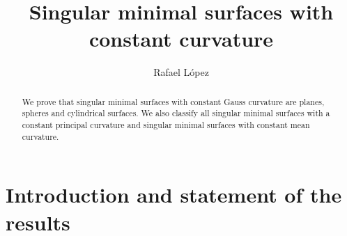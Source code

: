 \documentclass{birkjour}
\theoremstyle{definition}
\theoremstyle{remark}
\numberwithin{equation}{section}
\begin{document}
%
%
%
%
%
%
%
%
%


\title[Singular minimal surfaces with constant  curvature]
 {Singular minimal surfaces with constant  curvature}



 
\author{Rafael L\'opez}
\address{Department of Geometry and Topology. University of Granada. 18071  Granada, Spain}


 
\begin{abstract}
We prove that singular minimal surfaces with  constant Gauss curvature are planes, spheres and cylindrical surfaces. We also  classify all singular minimal surfaces with a constant principal curvature and  singular minimal surfaces with constant mean curvature.
\end{abstract}

\maketitle


  

 

\section{Introduction and statement of the results}

\end{document}
